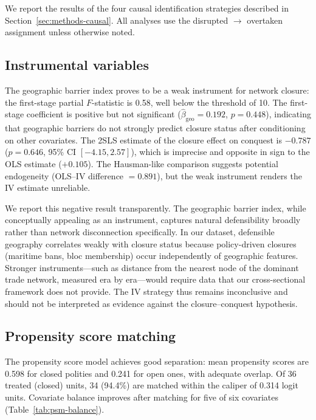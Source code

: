 \documentclass[pdflatex,sn-basic]{sn-jnl}
\theoremstyle{thmstyleone}%
\theoremstyle{thmstyletwo}%
\theoremstyle{thmstylethree}%
\begin{document}
We report the results of the four causal identification strategies described in Section~\ref{sec:methods-causal}. All analyses use the disrupted $\to$ overtaken assignment unless otherwise noted.

\subsection{Instrumental variables}\label{sec:causal-iv}

The geographic barrier index proves to be a weak instrument for network closure: the first-stage partial $F$-statistic is 0.58, well below the \citeauthor{StaigerStock1997} threshold of 10. The first-stage coefficient is positive but not significant ($\hat{\beta}_{\text{geo}} = 0.192$, $p = 0.448$), indicating that geographic barriers do not strongly predict closure status after conditioning on other covariates. The 2SLS estimate of the closure effect on conquest is $-0.787$ ($p = 0.646$, 95\% CI $[-4.15, 2.57]$), which is imprecise and opposite in sign to the OLS estimate ($+0.105$). The Hausman-like comparison suggests potential endogeneity (OLS--IV difference $= 0.891$), but the weak instrument renders the IV estimate unreliable.

We report this negative result transparently. The geographic barrier index, while conceptually appealing as an instrument, captures natural defensibility broadly rather than network disconnection specifically. In our dataset, defensible geography correlates weakly with closure status because policy-driven closures (maritime bans, bloc membership) occur independently of geographic features. Stronger instruments---such as distance from the nearest node of the dominant trade network, measured era by era---would require data that our cross-sectional framework does not provide. The IV strategy thus remains inconclusive and should not be interpreted as evidence against the closure--conquest hypothesis.

\subsection{Propensity score matching}\label{sec:causal-psm}

The propensity score model achieves good separation: mean propensity scores are 0.598 for closed polities and 0.241 for open ones, with adequate overlap. Of 36 treated (closed) units, 34 (94.4\%) are matched within the caliper of 0.314 logit units. Covariate balance improves after matching for five of six covariates (Table~\ref{tab:psm-balance}).
\end{document}
